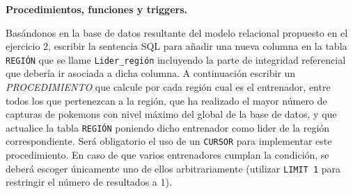 \documentclass[
    12pt,
    a4paper,
    addpoints,
    answers,
    convocatoria=ord,
    titulacion=NoCD,
    curso=2023/2024,
]{db-exam}
\begin{document}
\begin{questions}

\newpage
\question[1\half] \textbf{Procedimientos, funciones y triggers.}

Basándonos en la base de datos resultante del modelo relacional propuesto en el ejercicio 2, escribir la sentencia SQL para añadir una nueva columna en la tabla \texttt{REGIÓN} que se llame \texttt{Lider\_región} incluyendo la parte de integridad referencial que debería ir asociada a dicha columna. A continuación escribir un \emph{PROCEDIMIENTO} que calcule por cada región cual es el entrenador, entre todos los que pertenezcan a la región, que ha realizado el mayor número de capturas de pokemons con nivel máximo del global de la base de datos, y que actualice la tabla \texttt{REGIÓN} poniendo dicho entrenador como lider de la región correspondiente. Será obligatorio el uso de un \texttt{CURSOR} para implementar este procedimiento. En caso de que varios entrenadores cumplan la condición, se deberá escoger únicamente uno de ellos arbitrariamente (utilizar \texttt{LIMIT 1} para restringir el número de resultados a 1).
        

\end{questions}
\end{document}

